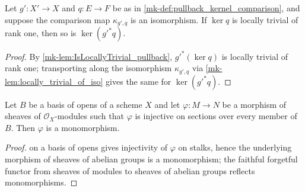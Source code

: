 \begin{lemma}\label{mk-lem:pullback_kernel_isLocallyTrivial_of_isIso_kernelComparison}
  \leanok

  Let \(g' : X' \to X\) and \(q : E \to F\) be as in
  \ref{mk-def:pullback_kernel_comparison}, and suppose the comparison map
  \(\kappa_{g',q}\) is an isomorphism. If \(\ker q\) is locally trivial of
  rank one, then so is \(\ker(g'^{*} q)\).
\end{lemma}
\begin{proof}
  \leanok{}
  By \ref{mk-lem:IsLocallyTrivial_pullback}, \(g'^{*}(\ker q)\) is locally
  trivial of rank one; transporting along the isomorphism \(\kappa_{g',q}\)
  via \ref{mk-lem:locally_trivial_of_iso} gives the same for
  \(\ker(g'^{*} q)\).
\end{proof}

\begin{lemma}\label{mk-lem:modules_mono_of_injective_app_of_isBasis}
  \leanok

  Let \(B\) be a basis of opens of a scheme \(X\) and let
  \(\varphi : M \to N\) be a morphism of sheaves of \(\mathcal O_X\)-modules
  such that \(\varphi\) is injective on sections over every member of \(B\).
  Then \(\varphi\) is a monomorphism.
\end{lemma}
\begin{proof}
  \leanokInjectivity on a basis of opens gives injectivity of \(\varphi\) on
  stalks, hence the underlying morphism of sheaves of abelian groups is a
  monomorphism; the faithful forgetful functor from sheaves of modules to
  sheaves of abelian groups reflects monomorphisms.
\end{proof}

